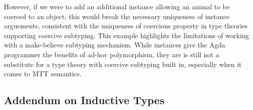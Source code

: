 However, if we were to add an additional instance allowing an animal to be
coerced to an object, this would break the necessary uniqueness of instance
arguements, consistent with the uniqueness of coercions property in type
theories supporting coercive subtyping. This example highlights the limitations
of working with a make-believe subtyping mechanism. While instances give the
Agda programmer the benefits of ad-hoc polymorphism, they are is still not a substitute for a type theory with coercive subtyping built in, especially when it comes to MTT semantics.

\subsection{Addendum on Inductive Types}

\begin{code}%
\>[0]\AgdaSpace{}%
\AgdaSpace{}%
\AgdaSymbol{:}\AgdaSpace{}%
\AgdaSpace{}%
\<%
\\
\>[0][@{}l@{\AgdaIndent{0}}]%
\>[2]\AgdaSpace{}%
\AgdaSymbol{:}\AgdaSpace{}%
\<%
\\
%
\>[2]\AgdaSpace{}%
\AgdaSymbol{:}\AgdaSpace{}%
\<%
\\
%
\\[\AgdaEmptyExtraSkip]%
\>[0]\AgdaSpace{}%
\AgdaSpace{}%
\AgdaSymbol{:}\AgdaSpace{}%
\AgdaSpace{}%
\<%
\\
\>[0][@{}l@{\AgdaIndent{0}}]%
\>[2]\AgdaSpace{}%
\AgdaSymbol{:}\AgdaSpace{}%
\AgdaSpace{}%
\AgdaSpace{}%
\<%
\\
%
\\[\AgdaEmptyExtraSkip]%
\>[0]\AgdaSpace{}%
\AgdaSymbol{:}\AgdaSpace{}%
\<%
\\
\>[0]\AgdaSpace{}%
\AgdaSymbol{=}\AgdaSpace{}%
\AgdaSpace{}%
\<%
\\
%
\\[\AgdaEmptyExtraSkip]%
\>[0]\<%
\\
\>[0]\AgdaSpace{}%
\AgdaSymbol{:}\AgdaSpace{}%
\AgdaSpace{}%
\AgdaSpace{}%

\end{code}
